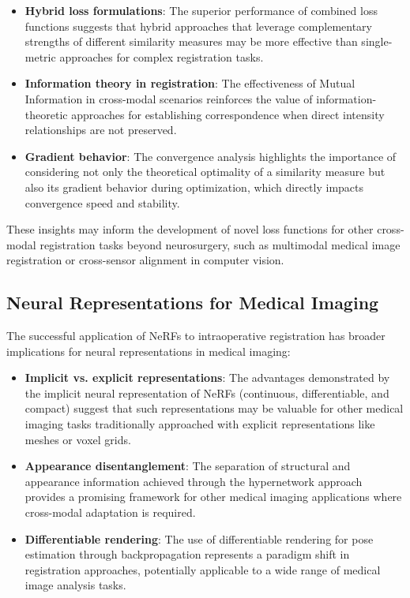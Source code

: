 \begin{itemize}
    \item \textbf{Hybrid loss formulations}: The superior performance of combined loss functions suggests that hybrid approaches that leverage complementary strengths of different similarity measures may be more effective than single-metric approaches for complex registration tasks.
    
    \item \textbf{Information theory in registration}: The effectiveness of Mutual Information in cross-modal scenarios reinforces the value of information-theoretic approaches for establishing correspondence when direct intensity relationships are not preserved.
    
    \item \textbf{Gradient behavior}: The convergence analysis highlights the importance of considering not only the theoretical optimality of a similarity measure but also its gradient behavior during optimization, which directly impacts convergence speed and stability.
\end{itemize}

These insights may inform the development of novel loss functions for other cross-modal registration tasks beyond neurosurgery, such as multimodal medical image registration or cross-sensor alignment in computer vision.

\subsection{Neural Representations for Medical Imaging}

The successful application of NeRFs to intraoperative registration has broader implications for neural representations in medical imaging:

\begin{itemize}
    \item \textbf{Implicit vs. explicit representations}: The advantages demonstrated by the implicit neural representation of NeRFs (continuous, differentiable, and compact) suggest that such representations may be valuable for other medical imaging tasks traditionally approached with explicit representations like meshes or voxel grids.
    
    \item \textbf{Appearance disentanglement}: The separation of structural and appearance information achieved through the hypernetwork approach provides a promising framework for other medical imaging applications where cross-modal adaptation is required.
    
    \item \textbf{Differentiable rendering}: The use of differentiable rendering for pose estimation through backpropagation represents a paradigm shift in registration approaches, potentially applicable to a wide range of medical image analysis tasks.
\end{itemize}


